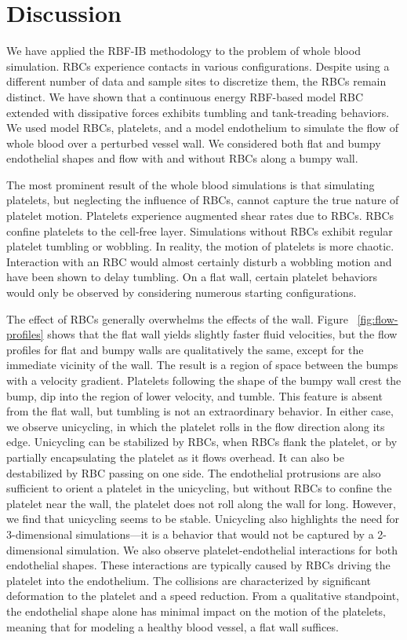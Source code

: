 \section{Discussion}\label{sec:conclusion}

We have applied the RBF-IB methodology to the problem of whole blood simulation. RBCs
experience contacts in various configurations. Despite using a different number of data
and sample sites to discretize them, the RBCs remain distinct. We have shown that a
continuous energy RBF-based model RBC extended with dissipative forces exhibits tumbling
and tank-treading behaviors. We used model RBCs, platelets, and a model endothelium to
simulate the flow of whole blood over a perturbed vessel wall. We considered both flat
and bumpy endothelial shapes and flow with and without RBCs along a bumpy wall.

The most prominent result of the whole blood simulations is that simulating platelets,
but neglecting the influence of RBCs, cannot capture the true nature of platelet motion.
Platelets experience augmented shear rates due to RBCs. RBCs confine platelets to the
cell-free layer. Simulations without RBCs exhibit regular platelet tumbling or wobbling.
In reality, the motion of platelets is more chaotic. Interaction with an RBC would almost
certainly disturb a wobbling motion and have been shown to delay tumbling. On a flat
wall, certain platelet behaviors would only be observed by considering numerous starting
configurations.

The effect of RBCs generally overwhelms the effects of the wall. Figure~%
\ref{fig:flow-profiles} shows that the flat wall yields slightly faster fluid velocities,
but the flow profiles for flat and bumpy walls are qualitatively the same, except for the
immediate vicinity of the wall. The result is a region of space between the bumps with a
velocity gradient. Platelets following the shape of the bumpy wall crest the bump, dip
into the region of lower velocity, and tumble. This feature is absent from the flat wall,
but tumbling is not an extraordinary behavior. In either case, we observe unicycling, in
which the platelet rolls in the flow direction along its edge. Unicycling can be
stabilized by RBCs, when RBCs flank the platelet, or by partially encapsulating the
platelet as it flows overhead. It can also be destabilized by RBC passing on one side.
The endothelial protrusions are also sufficient to orient a platelet in the unicycling,
but without RBCs to confine the platelet near the wall, the platelet does not roll along
the wall for long. However, we find that unicycling seems to be stable. Unicycling also
highlights the need for 3-dimensional simulations---it is a behavior that would not be
captured by a 2-dimensional simulation. We also observe platelet-endothelial interactions
for both endothelial shapes. These interactions are typically caused by RBCs driving the
platelet into the endothelium. The collisions are characterized by significant
deformation to the platelet and a speed reduction. From a qualitative standpoint, the
endothelial shape alone has minimal impact on the motion of the platelets, meaning that
for modeling a healthy blood vessel, a flat wall suffices.

